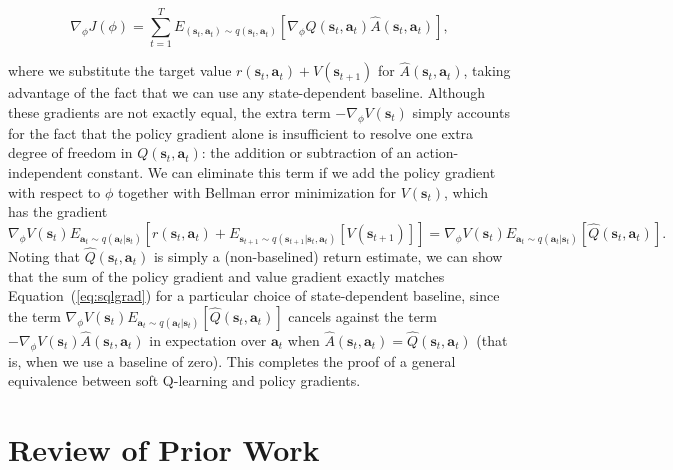 \begin{equation}
\nabla_\phi J(\phi) = \sum_{t=1}^T E_{(\mathbf{s}_t,\mathbf{a}_t)\sim q(\mathbf{s}_t,\mathbf{a}_t)}\left[
\nabla_\phi Q(\mathbf{s}_t,\mathbf{a}_t) \hat{A}(\mathbf{s}_t,\mathbf{a}_t)
\right], \label{eq:sqlgrad}
\end{equation}

where we substitute the target value $r(\mathbf{s}_t,\mathbf{a}_t) + V(\mathbf{s}_{t+1})$ for $\hat{A}(\mathbf{s}_t,\mathbf{a}_t)$, taking advantage of the fact that we can use any state-dependent baseline. Although these gradients are not exactly equal, the extra term $- \nabla_\phi V(\mathbf{s}_t)$ simply accounts for the fact that the policy gradient alone is insufficient to resolve one extra degree of freedom in $Q(\mathbf{s}_t,\mathbf{a}_t)$: the addition or subtraction of an action-independent constant. We can eliminate this term if we add the policy gradient with respect to $\phi$ together with Bellman error minimization for $V(\mathbf{s}_t)$, which has the gradient
\[
\nabla_\phi V(\mathbf{s}_t) E_{\mathbf{a}_t \sim q(\mathbf{a}_t|\mathbf{s}_t)} \left[
r(\mathbf{s}_t,\mathbf{a}_t) + E_{\mathbf{s}_{t+1} \sim q(\mathbf{s}_{t+1}|\mathbf{s}_t,\mathbf{a}_t)}[V(\mathbf{s}_{t+1})]
\right] = \nabla_\phi V(\mathbf{s}_t) E_{\mathbf{a}_t \sim q(\mathbf{a}_t|\mathbf{s}_t)}[\hat{Q}(\mathbf{s}_t,\mathbf{a}_t)].
\]
Noting that $\hat{Q}(\mathbf{s}_t,\mathbf{a}_t)$ is simply a (non-baselined) return estimate, we can show that the sum of the policy gradient and value gradient exactly matches Equation~(\ref{eq:sqlgrad}) for a particular choice of state-dependent baseline, since the term $\nabla_\phi V(\mathbf{s}_t) E_{\mathbf{a}_t \sim q(\mathbf{a}_t|\mathbf{s}_t)}[\hat{Q}(\mathbf{s}_t,\mathbf{a}_t)]$ cancels against the term $-\nabla_\phi V(\mathbf{s}_t) \hat{A}(\mathbf{s}_t,\mathbf{a}_t)$ in expectation over $\mathbf{a}_t$ when $\hat{A}(\mathbf{s}_t,\mathbf{a}_t) = \hat{Q}(\mathbf{s}_t,\mathbf{a}_t)$ (that is, when we use a baseline of zero). This completes the proof of a general equivalence between soft Q-learning and policy gradients.

\section{Review of Prior Work}
\label{sec:related}

